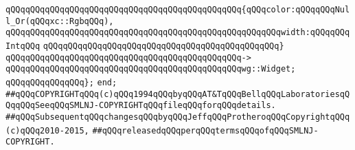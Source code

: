 \verb|qQQqqQQqqQQqqQQqqQQqqQQqqQQqqQQqqQQqqQQqqQQqqQQq{qQQqcolor:qQQqqQQqNull_Or(qQQqxc::RgbqQQq),|\newline
\verb|qQQqqQQqqQQqqQQqqQQqqQQqqQQqqQQqqQQqqQQqqQQqqQQqqQQqqQQqwidth:qQQqqQQqIntqQQq|\newline
\verb|qQQqqQQqqQQqqQQqqQQqqQQqqQQqqQQqqQQqqQQqqQQqqQQq}|\newline
\verb|qQQqqQQqqQQqqQQqqQQqqQQqqQQqqQQqqQQqqQQqqQQqqQQq->|\newline
\verb|qQQqqQQqqQQqqQQqqQQqqQQqqQQqqQQqqQQqqQQqqQQqqQQqwg::Widget;|\newline
\verb|qQQqqQQqqQQqqQQq};|\newline
\newline
\verb|end;|\newline
\newline
\verb|##qQQqCOPYRIGHTqQQq(c)qQQq1994qQQqbyqQQqAT&TqQQqBellqQQqLaboratoriesqQQqqQQqSeeqQQqSMLNJ-COPYRIGHTqQQqfileqQQqforqQQqdetails.|\newline
\verb|##qQQqSubsequentqQQqchangesqQQqbyqQQqJeffqQQqProtheroqQQqCopyrightqQQq(c)qQQq2010-2015,|\newline
\verb|##qQQqreleasedqQQqperqQQqtermsqQQqofqQQqSMLNJ-COPYRIGHT.|\newline

